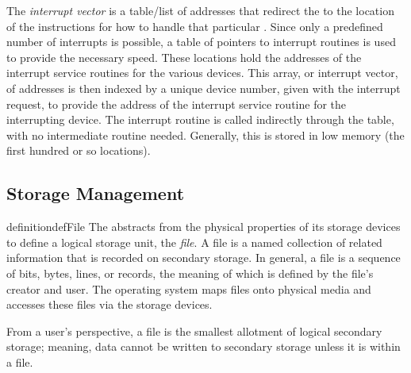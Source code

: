 \begin{definition}\label{def:Interrupt_Vector}
  The \emph{interrupt vector} is a table/list of addresses that redirect the  to the location of the instructions for how to handle that particular .
  Since only a predefined number of interrupts is possible, a table of pointers to interrupt routines is used to provide the necessary speed.
  These locations hold the addresses of the interrupt service routines for the various devices.
  This array, or interrupt vector, of addresses is then indexed by a unique device number, given with the interrupt request, to provide the address of the interrupt service routine for the interrupting device.
  The interrupt routine is called indirectly through the table, with no intermediate routine needed.
  Generally, this is stored in low memory (the first hundred or so locations).
\end{definition}

\subsection{Storage Management}\label{subsec:Storage_Management}
\begin{restatable}[File]{definition}{defFile}\label{def:File}
  The  abstracts from the physical properties of its storage devices to define a logical storage unit, the \emph{file}.
  A file is a named collection of related information that is recorded on secondary storage.
  In general, a file is a sequence of bits, bytes, lines, or records, the meaning of which is defined by the file's creator and user.
  The operating system maps files onto physical media and accesses these files via the storage devices.

  From a user’s perspective, a file is the smallest allotment of logical secondary storage; meaning, data cannot be written to secondary storage unless it is within a file.
\end{restatable}











